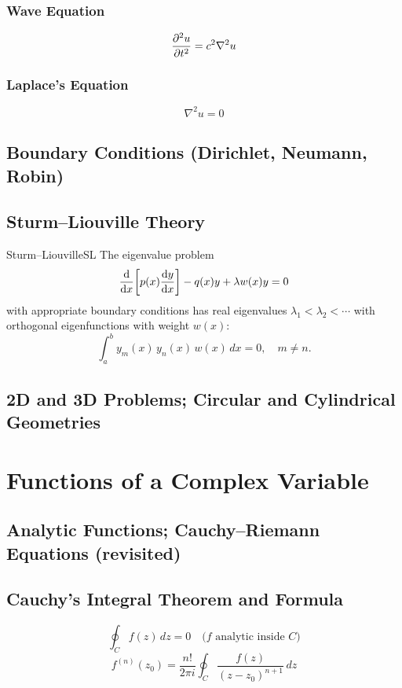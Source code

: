 \documentclass[11pt, letterpaper]{article}
\theoremstyle{plain}
\begin{document}
\subsubsection*{Wave Equation}
\[
  \pdv[2]{u}{t} = c^2\nabla^2 u
\]

\subsubsection*{Laplace's Equation}
\[
  \nabla^2 u = 0
\]

\subsection{Boundary Conditions (Dirichlet, Neumann, Robin)}

\subsection{Sturm–Liouville Theory}

\begin{theorem}{Sturm–Liouville}{SL}
  The eigenvalue problem
  \[
    \dv{}{x}\!\left[p(x)\dv{y}{x}\right] - q(x)y + \lambda w(x)y = 0
  \]
  with appropriate boundary conditions has real eigenvalues
  $\lambda_1 < \lambda_2 < \cdots$ with orthogonal eigenfunctions
  with weight $w(x)$:
  \[
    \int_a^b y_m(x)\,y_n(x)\,w(x)\,dx = 0, \quad m\neq n.
  \]
\end{theorem}

\subsection{2D and 3D Problems; Circular and Cylindrical Geometries}


\section{Functions of a Complex Variable} %

\subsection{Analytic Functions; Cauchy–Riemann Equations (revisited)}

\subsection{Cauchy's Integral Theorem and Formula}
\[
  \oint_C f(z)\,dz = 0 \quad \text{($f$ analytic inside $C$)}
\]
\[
  f^{(n)}(z_0) = \frac{n!}{2\pi i}\oint_C \frac{f(z)}{(z-z_0)^{n+1}}\,dz
\]
\end{document}
